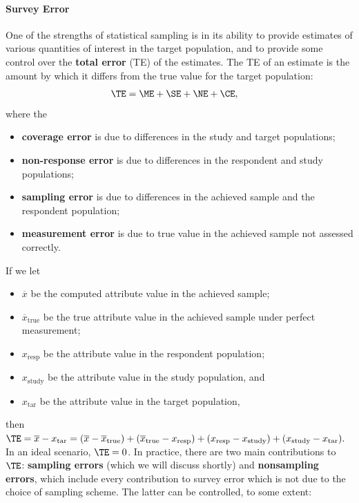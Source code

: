 \paragraph{Survey Error} 
One of the strengths of statistical sampling is in its ability to provide estimates of various quantities of interest in the target population, and to provide some control over the  \textbf{total error} (TE) of the estimates. The TE of an estimate is the amount by which it differs from the true value for the target population:
\begin{align*} 
\TE  & =  \ME  +  \SE +  \NE +  \CE, \end{align*}
where the 
\begin{itemize}[noitemsep]
\item \textbf{coverage error} is due to differences in the study and target populations; 
\item \textbf{non-response error} is due to differences in the respondent and study populations;
\item \textbf{sampling error} is due to differences in the achieved sample and the respondent population; 
\item \textbf{measurement error} is due to true value in the achieved sample not assessed correctly.
\end{itemize}
If we let 
\begin{itemize}[noitemsep]
\item $\overline{x}$ be the computed attribute value in the achieved sample; 
\item $\overline{x}_{\mathrm{true}}$ be the true attribute value in the achieved sample under perfect measurement;
\item $x_{\mathrm{resp}}$ be the attribute value in the respondent population;
\item $x_{\mathrm{study}}$ be the attribute value in the study population, and 
\item $x_{\mathrm{tar}}$ be the attribute value in the target population,
\end{itemize}
then 
$\TE  = \overline{x} - x_{\mathrm{tar}} =  (\overline{x} - \overline{x}_{\mathrm{true}}) + (\overline{x}_{\mathrm{true}}-x_{\mathrm{resp}}) + (x_{\mathrm{resp}}-x_{\mathrm{study}}) + (x_{\mathrm{study}}-x_{\mathrm{tar}}).$\newl In an ideal scenario, $\TE=0$. In practice, there are two main contributions to $\TE$: \textbf{sampling errors} (which we will discuss shortly) and \textbf{nonsampling errors}, which include every contribution to survey error which is not due to the choice of sampling scheme. The latter can be controlled, to some extent: 
